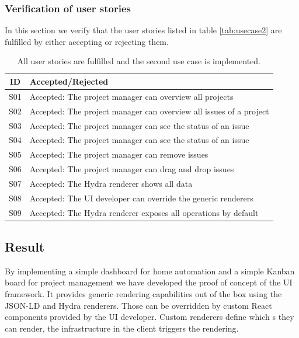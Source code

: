 \subsubsection{Verification of user stories}
In this section we verify that the user stories listed in table \ref{tab:usecase2} are fulfilled by either accepting or rejecting them.

\begin{table}
  \begin{center}
    \begin{tabular}{ |c|l| }
      \hline
      ID & Accepted/Rejected \\
      \hline
      S01 & Accepted: The project manager can overview all projects \\
      S02 & Accepted: The project manager can overview all issues of a project \\
      S03 & Accepted: The project manager can see the status of an issue \\
      S04 & Accepted: The project manager can see the status of an issue \\
      S05 & Accepted: The project manager can remove issues \\
      S06 & Accepted: The project manager can drag and drop issues \\
      S07 & Accepted: The Hydra renderer shows all data \\
      S08 & Accepted: The UI developer can override the generic renderers \\
      S09 & Accepted: The Hydra renderer exposes all operations by default \\
      \hline
    \end{tabular}
    \caption{All user stories are fulfilled and the second use case is implemented.}
  \end{center}
\end{table}

\subsection{Result}
By implementing a simple dashboard for home automation and a simple Kanban board for project management we have developed the proof of concept of the UI framework. It provides generic rendering capabilities out of the box using the JSON-LD and Hydra renderers. Those can be overridden by custom React components provided by the UI developer. Custom renderers define which s they can render, the infrastructure in the client triggers the rendering.

